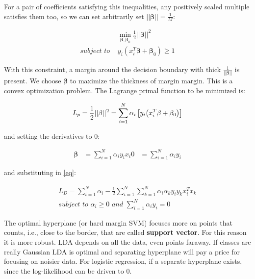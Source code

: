 \documentclass[12pt, letterpaper]{article}
\theoremstyle{definition}
\newcommand{\be}{\mathbf{\beta}}
\DeclarePairedDelimiter\autobracket{(}{)}
\newcommand{\br}[1]{\autobracket*{#1}}
\let\tb\textbf
\begin{document}
For a pair of coefficients satisfying this inequalities, any positively scaled multiple satisfies them too, so we can set arbitrarily set $||\be||=\frac{1}{M}$:

\begin{equation}
\begin{aligned}
&\min_{\be, \be_0}{\frac{1}{2}||\be||^2}\\
\textit{subject to } &y_i(x_i^T\be+\be_0)\ge1
\end{aligned}
\end{equation}

With this constraint, a margin around the decision boundary with thick $\frac{1}{||\be||}$ is present. We choose $\be$ to maximize the thickness of margin margin.  This is a convex optimization problem. The Lagrange primal function to be minimized is:

\begin{equation}
\label{eq}
L_p = \frac{1}{2} ||\be||^2 = \sum_{i=1}^N \alpha_i\left[ y_i \br{x_i^T\be+\be_0}\right]

\end{equation}

and setting the derivatives to $0$:

\begin{equation}
\begin{aligned}
\be &= \sum_{i=1}^N \alpha_i y_i x_i
0  &= \sum_{i=1}^N \alpha_i y_i
\end{aligned}
\end{equation}

and substituting in \ref{eq}:

\begin{equation}
\begin{aligned}
L_D = \sum_{i=1}^N \alpha_i -\frac{1}{2}\sum_{i=1}^N\sum_{k=1}^N \alpha_i \alpha_ky_iy_kx_i^Tx_k\\
\textit{subject to } \alpha_i\ge0 \textit{ and } \sum_{i=1}^N \alpha_iy_i=0
\end{aligned}
\end{equation}
\fi


The optimal hyperplane (or hard margin SVM) focuses more on points that counts, i.e., close to the border, that are called \tb{support vector}. For this reason it is more robust. LDA depends on all the data, even points faraway. If classes are really Gaussian LDA is optimal and separating hyperplane will pay a price for focusing on noisier data.
For logistic regression, if a separate hyperplane exists, since the log-likelihood can be driven to $0$.
\end{document}
